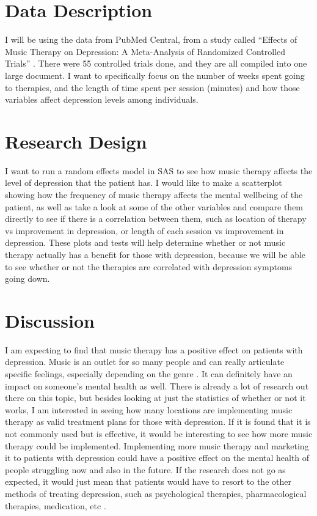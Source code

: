 \documentclass[12pt]{article}
\begin{document}
 \section{Data Description}
 \label{sec:data}

 I will be using the data from PubMed Central, from a study called “Effects of Music Therapy on Depression: A Meta-Analysis of Randomized Controlled Trials” \cite{PLOS}. There were 55 controlled trials done, and they are all compiled into one large document. I want to specifically focus on the number of weeks spent going to therapies, and the length of time spent per session (minutes) and how those variables affect depression levels among individuals.


 \section{Research Design}
 \label{sec:research}

 I want to run a random effects model in SAS to see how music therapy affects the level of depression that the patient has. I would like to make a scatterplot showing how the frequency of music therapy affects the mental wellbeing of the patient, as well as take a look at some of the other variables and compare them directly to see if there is a correlation between them, such as location of therapy vs improvement in depression, or length of each session vs improvement in depression. These plots and tests will help determine whether or not music therapy actually has a benefit for those with depression, because we will be able to see whether or not the therapies are correlated with depression symptoms going down.

 \section{Discussion}
 \label{sec:disc}

 I am expecting to find that music therapy has a positive effect on patients with depression. Music is an outlet for so many people and can really articulate specific feelings, especially depending on the genre \cite{Frontiers}. It can definitely have an impact on someone’s mental health as well. There is already a lot of research out there on this topic, but besides looking at just the statistics of whether or not it works, I am interested in seeing how many locations are implementing music therapy as valid treatment plans for those with depression. If it is found that it is not commonly used but is effective, it would be interesting to see how more music therapy could be implemented. Implementing more music therapy and marketing it to patients with depression could have a positive effect on the mental health of people struggling now and also in the future. If the research does not go as expected, it would just mean that patients would have to resort to the other methods of treating depression, such as psychological therapies, pharmacological therapies, medication, etc \cite{Cochrane}.
\end{document}

